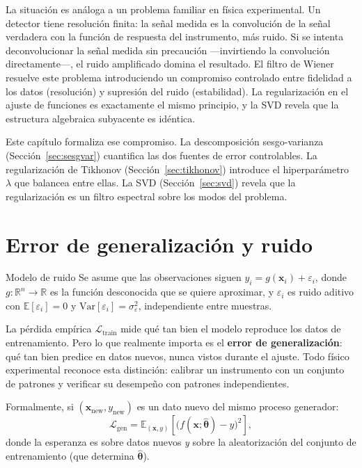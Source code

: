 La situación es análoga a un problema familiar en física experimental.
Un detector tiene resolución finita: la señal medida es la convolución
de la señal verdadera con la función de respuesta del instrumento, más
ruido. Si se intenta deconvolucionar la señal medida sin precaución
—invirtiendo la convolución directamente—, el ruido amplificado domina
el resultado. El filtro de Wiener resuelve este problema introduciendo
un compromiso controlado entre fidelidad a los datos (resolución) y
supresión del ruido (estabilidad). La regularización en el ajuste de
funciones es exactamente el mismo principio, y la SVD revela que la
estructura algebraica subyacente es idéntica.

Este capítulo formaliza ese compromiso. La descomposición
sesgo-varianza (Sección~\ref{sec:sesgvar}) cuantifica las dos fuentes
de error controlables. La regularización de Tikhonov
(Sección~\ref{sec:tikhonov}) introduce el hiperparámetro $\lambda$ que
balancea entre ellas. La SVD (Sección~\ref{sec:svd}) revela que la
regularización es un filtro espectral sobre los modos del problema.

\section{Error de generalización y ruido}
\label{sec:generalizacion}


\begin{definicion}{Modelo de ruido}
\label{def:ruido}
Se asume que las observaciones siguen
$y_i = g(\bm{x}_i) + \varepsilon_i$,
donde $g: \mathbb{R}^n \to \mathbb{R}$ es la función desconocida que se
quiere aproximar, y $\varepsilon_i$ es ruido aditivo con
$\mathbb{E}[\varepsilon_i] = 0$ y
$\text{Var}[\varepsilon_i] = \sigma_\varepsilon^2$, independiente entre
muestras.
\end{definicion}

La pérdida empírica $\mathcal{L}_{\text{train}}$ mide qué tan bien el
modelo reproduce los datos de entrenamiento. Pero lo que realmente
importa es el \textbf{error de generalización}: qué tan bien predice en
datos nuevos, nunca vistos durante el ajuste. Todo físico experimental
reconoce esta distinción: calibrar un instrumento con un conjunto de
patrones y verificar su desempeño con patrones independientes.

Formalmente, si $(\bm{x}_{\text{new}}, y_{\text{new}})$ es un dato
nuevo del mismo proceso generador:
\begin{equation}
  \mathcal{L}_{\text{gen}} = \mathbb{E}_{(\bm{x},y)}\left[
  \bigl(f(\bm{x};\hat{\bm{\theta}}) - y\bigr)^2\right],
  \label{eq:loss_gen}
\end{equation}
donde la esperanza es sobre datos nuevos \emph{y} sobre la
aleatorización del conjunto de entrenamiento (que determina
$\hat{\bm{\theta}}$).

